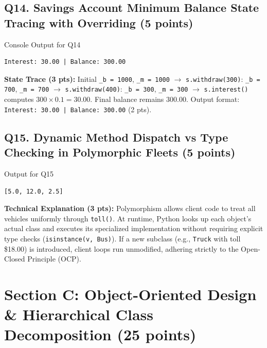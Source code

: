 \documentclass[11pt,a4paper]{article}
\begin{document}
\begin{center}
\begin{tabularx}{\textwidth}{|p{4.5cm}|X|X|}
\hline
\end{tabularx}
\end{center}

\subsection*{Q14. Savings Account Minimum Balance State Tracing with Overriding (5 points)}
\begin{solbox}{Console Output for Q14}
\begin{verbatim}
Interest: 30.00 | Balance: 300.00
\end{verbatim}
\end{solbox}
\textbf{State Trace (3 pts):} Initial \texttt{\_b = 1000}, \texttt{\_m = 1000} $\to$ \texttt{s.withdraw(300)}: \texttt{\_b = 700}, \texttt{\_m = 700} $\to$ \texttt{s.withdraw(400)}: \texttt{\_b = 300}, \texttt{\_m = 300} $\to$ \texttt{s.interest()} computes $300 \times 0.1 = \mathbf{30.00}$. Final balance remains $\mathbf{300.00}$. Output format: \texttt{Interest: 30.00 | Balance: 300.00} (2 pts).

\subsection*{Q15. Dynamic Method Dispatch vs Type Checking in Polymorphic Fleets (5 points)}
\begin{solbox}{Output for Q15}
\begin{verbatim}
[5.0, 12.0, 2.5]
\end{verbatim}
\end{solbox}
\textbf{Technical Explanation (3 pts):}
Polymorphism allows client code to treat all vehicles uniformly through \texttt{toll()}. At runtime, Python looks up each object's actual class and executes its specialized implementation without requiring explicit type checks (\texttt{isinstance(v, Bus)}). If a new subclass (e.g., \texttt{Truck} with toll \$18.00) is introduced, client loops run unmodified, adhering strictly to the Open-Closed Principle (OCP).

\newpage
\section*{Section C: Object-Oriented Design \& Hierarchical Class Decomposition (25 points)}
\end{document}
